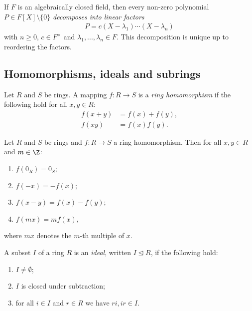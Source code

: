 \documentclass{article}
\begin{document}
\begin{theorem}[Notes 3.3.14]
	If $F$ is an algebraically closed field, then every non-zero polynomial
	$P\in F[X]\setminus\{0\}$ \emph{decomposes into linear factors}
	\begin{align*}
		P=c(X-\lambda_1)\cdots(X-\lambda_n)
	\end{align*}
	with $n\geq 0$, $c\in F^\times$ and $\lambda_1,...,\lambda_n\in F$. This
	decomposition is unique up to reordering the factors.
\end{theorem}

\subsection{Homomorphisms, ideals and subrings}

\begin{definition}
	Let $R$ and $S$ be rings. A mapping $f:R\to S$ is a \emph{ring homomorphism} if
	the following hold for all $x,y\in R$:
	\begin{align*}
		f(x+y) & = f(x) + f(y), \\
		f(xy)  & = f(x)f(y).
	\end{align*}
\end{definition}

\begin{lemma}[Notes 3.4.5]
	Let $R$ and $S$ be rings and $f:R\to S$ a ring homomorphism. Then for all $x,y\in R$
	and $m\in\Z$:
	\begin{enumerate}
		\item $f(0_R)=0_S$;
		\item $f(-x)=-f(x)$;
		\item $f(x-y)=f(x)-f(y)$;
		\item $f(mx)=mf(x)$,
	\end{enumerate}
	where $mx$ denotes the $m$-th multiple of $x$.
\end{lemma}

\begin{definition}
	A subset $I$ of a ring $R$ is an \emph{ideal}, written $I\trianglelefteq R$, if
	the following hold:
	\begin{enumerate}
		\item $I\not=\emptyset$;
		\item $I$ is closed under subtraction;
		\item for all $i\in I$ and $r\in R$ we have $ri,ir\in I$.
	\end{enumerate}
\end{definition}
\end{document}
